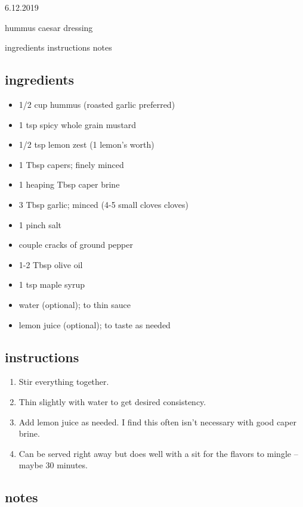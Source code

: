 \documentclass[]{book}
\providecommand{\tightlist}{%
  \setlength{\itemsep}{0pt}\setlength{\parskip}{0pt}}
\begin{document}
6.12.2019

hummus caesar dressing

ingredients \textbar{}
instructions \textbar{}
notes

\hypertarget{ingredients-26}{%
\subsection{ingredients}\label{ingredients-26}}

\begin{itemize}
\tightlist
\item
  1/2 cup hummus (roasted garlic preferred)
\item
  1 tsp spicy whole grain mustard
\item
  1/2 tsp lemon zest (1 lemon's worth)
\item
  1 Tbsp capers; finely minced
\item
  1 heaping Tbsp caper brine
\item
  3 Tbsp garlic; minced (4-5 small cloves cloves)
\item
  1 pinch salt
\item
  couple cracks of ground pepper
\item
  1-2 Tbsp olive oil
\item
  1 tsp maple syrup
\item
  water (optional); to thin sauce
\item
  lemon juice (optional); to taste as needed
\end{itemize}

\hypertarget{instructions-26}{%
\subsection{instructions}\label{instructions-26}}

\begin{enumerate}
\def\labelenumi{\arabic{enumi}.}
\tightlist
\item
  Stir everything together.
\item
  Thin slightly with water to get desired consistency.
\item
  Add lemon juice as needed. I find this often isn't necessary with good caper brine.
\item
  Can be served right away but does well with a sit for the flavors to mingle -- maybe 30 minutes.
\end{enumerate}

\hypertarget{notes-26}{%
\subsection{notes}\label{notes-26}}
\end{document}
